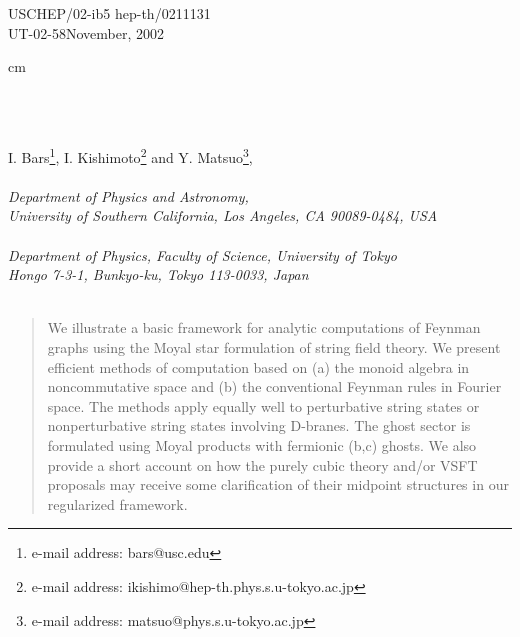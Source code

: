\documentclass[a4paper,11pt]{article}
\begin{document}
\begin{titlepage}
\thispagestyle{empty}
\begin{flushleft}
USCHEP/02-ib5
\hfill hep-th/0211131 \\
UT-02-58\hfill November, 2002 \\
\end{flushleft}

 cm
\bigskip

\begin{center}
\\
\noindent{
 }\\
\renewcommand{\thefootnote}{\fnsymbol{footnote}}

\vskip 2cm
{\large
I. Bars\coordHE{}\footnote{e-mail address: bars@usc.edu},
I. Kishimoto\coordHE{}\footnote{e-mail address:
 ikishimo@hep-th.phys.s.u-tokyo.ac.jp} and
Y. Matsuo\coordHE{}\footnote{e-mail address:
 matsuo@phys.s.u-tokyo.ac.jp}, } \\
{\it
\noindent{ \bigskip }\\
\coordHE{} Department of Physics and Astronomy,\\
University of Southern California, Los Angeles, CA 90089-0484, USA \\
\noindent{\smallskip  }\\
\coordHE{} Department of Physics, Faculty of Science, University of Tokyo \\
Hongo 7-3-1, Bunkyo-ku, Tokyo 113-0033, Japan\\
\noindent{ \smallskip }\\
}
\bigskip
\end{center}
\begin{abstract}
We illustrate a basic framework for analytic computations of
Feynman graphs using the Moyal star formulation of string field
theory. We present efficient methods of computation based on (a)
the monoid algebra in noncommutative space and (b) the
conventional Feynman rules in Fourier space. The methods apply
equally well to perturbative string states or nonperturbative
string states involving D-branes. The ghost sector is formulated
using Moyal products with fermionic (b,c) ghosts. We also provide
a short account on how the purely cubic theory and/or VSFT
proposals may receive some clarification of their midpoint
structures in our regularized framework.
\end{abstract}
\vfill
\end{titlepage}\vfill\setcounter{footnote}{0} \renewcommand{\thefootnote}{%
\arabic{footnote}} \newpage
\end{document}
